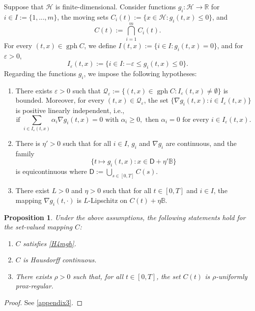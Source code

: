 \documentclass[preprint,12pt]{elsarticle}
\renewcommand{\epsilon}{\varepsilon}
\renewcommand{\H}{\mathcal{H}}
\newcommand{\R}{\mathbb{R}}
\newcommand{\tto}{\rightrightarrows}
\newcommand{\gph}{\operatorname{gph}}
\def \B{\mathbb{B}}
\newcommand{\bd}{{\operatorname{bd \ }}}
\theoremstyle{plain}
\newtheorem{proposition}[theorem]{Proposition}
\theoremstyle{definition}
\theoremstyle{remark}
\begin{document}
    Suppose that $\H$ is finite-dimensional. Consider functions $g_i\colon \H\to \R$ for $i\in I := \{1,...,m\}$, the moving sets $C_i(t) := \{x\in \H : g_i(t,x)\leq 0\}$, and 
    \begin{equation*}
        C(t) := \bigcap_{i=1}^m C_i(t).    
    \end{equation*}
    For every $(t,x)\in \gph C$, we define $I(t,x) := \{i\in I : g_i(t,x) = 0\}$, and for $\epsilon>0$, $$I_\epsilon(t,x) := \{i\in I : -\epsilon\leq g_i(t,x)\leq 0\}.$$
    Regarding the functions $g_i$, we impose the following hypotheses:
 \begin{enumerate}[label = ($\alph*$)]
    \item There exists $\epsilon>0$ such that $\mathscr{Q}_\epsilon := \{(t,x)\in \gph C : I_{\epsilon}(t,x)\neq\emptyset\}$ is bounded. Moreover, for every $(t,x)\in \mathscr{Q}_\epsilon$, the set $\{\nabla g_i(t,x) : i\in I_{\epsilon}(t,x)\}$ is positive linearly independent, i.e.,  
    $$
    \textrm{if } \sum_{i\in I_\epsilon(t,x)}\alpha_i \nabla g_i(t,x) = 0 \textrm{ with } \alpha_i\geq 0, \textrm{ then } \alpha_i = 0 \textrm{ for every } i\in I_\epsilon (t,x).
    $$
    \item There is $\eta'>0$ such that for all $i\in I$,  $g_i$ and $\nabla g_i$ are continuous, and the family $$\{ t\mapsto g_i(t,x) : x\in \mathsf{D} + \eta'\B \}$$ is equicontinuous where $\mathsf{D} := \bigcup_{s\in [0,T]} C(s)$.
 	\item There exist $L>0$ and $\eta>0$ such that for all $t\in [0,T]$ and $i\in I$, the mapping $\nabla g_i(t,\cdot)$ is $L$-Lipschitz on $C(t) + \eta\B$.
 \end{enumerate}
 \begin{proposition}\label{prop-sublevel-h4-h5}
 	Under the above assumptions, the following statements hold for the set-valued mapping $C$:
 	\begin{enumerate}[label = (\roman*)]
 		\item $C$ satisfies \ref{H4mgh}.
 		\item $C$ is Hausdorff continuous.
 		\item There exists $\rho>0$ such that, for all $t\in [0,T]$, the set $C(t)$ is $\rho$-uniformly prox-regular.
 	\end{enumerate}
 \end{proposition}
\begin{proof} 
See \ref{appendix3}.
 \end{proof}
	
\end{document}

